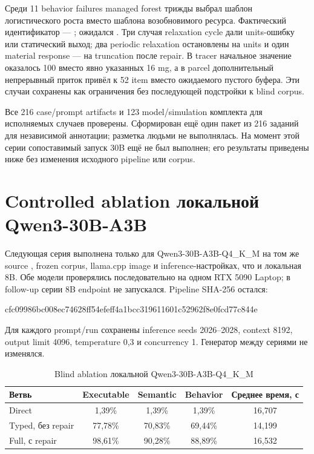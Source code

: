 Среди 11 behavior failures managed forest трижды выбрал шаблон логистического роста вместо шаблона возобновимого ресурса. Фактический идентификатор --- ; ожидался . Три случая relaxation cycle дали units-ошибку или статический выход; два periodic relaxation остановлены на units и один material response --- на truncation после repair. В tracer начальное значение оказалось 100 вместо явно указанных 16 mg, а в parcel дополнительный непрерывный приток привёл к 52 item вместо ожидаемого пустого буфера. Эти случаи сохранены как ограничения без последующей подстройки к blind corpus.

Все 216 case/prompt artifacts и 123 model/simulation комплекта для исполняемых случаев проверены. Сформирован ещё один пакет из 216 заданий для независимой аннотации; разметка людьми не выполнялась. На момент этой серии сопоставимый запуск 30B ещё не был выполнен; его результаты приведены ниже без изменения исходного pipeline или corpus.

\section{Controlled ablation локальной Qwen3-30B-A3B}

Следующая серия выполнена только для Qwen3-30B-A3B-Q4\_K\_M на том же source , frozen corpus, llama.cpp image и inference-настройках, что и локальная 8B. Обе модели проверялись последовательно на одном RTX 5090 Laptop; в follow-up серии 8B endpoint не запускался. Pipeline SHA-256 остался:
\begin{center}
\scriptsize\ttfamily cfc09986bc008ec746\allowbreak 28ff54efeff4a1bcc3\allowbreak 19611601c52962f8e0fcd\allowbreak 77c844e
\end{center}
Для каждого prompt/run сохранены inference seeds 2026--2028, context 8192, output limit 4096, temperature 0,3 и concurrency 1. Генератор между сериями не изменялся.

\begin{table}[H]
    \centering
    \caption{Blind ablation локальной Qwen3-30B-A3B-Q4\_K\_M}
    \label{tab:local-qwen30b-ablation}
    \small
    \begin{tabular}{lcccc}
        \toprule
        Ветвь & Executable & Semantic & Behavior & Среднее время, с \\
        \midrule
        Direct & 1,39\% & 1,39\% & 1,39\% & 16,707 \\
        Typed, без repair & 77,78\% & 70,83\% & 69,44\% & 14,199 \\
        Full, с repair & 98,61\% & 90,28\% & 88,89\% & 16,532 \\
        \bottomrule
    \end{tabular}
\end{table}

